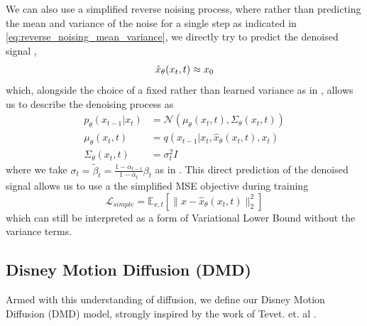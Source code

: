 We can also use a simplified reverse noising process, where rather than predicting the mean and variance of the noise for a single step as indicated in \eqref{eq:reverse_noising_mean_variance}, we directly try to predict the denoised signal \cite{ramesh2022hierarchical},
\begin{equation}
    \hat{x}_{\theta}(x_t, t) \approx x_0 \\
\end{equation}
which, alongside the choice of a fixed rather than learned variance as in \cite{ddpm}, allows us to describe the denoising process as
\begin{equation}
    \begin{aligned}
    p_{\theta}(x_{t-1} | x_t) &= \mathcal{N}(\mu_{\theta}(x_t, t), \Sigma_{\theta}(x_t, t)) \\
    \mu_{\theta}(x_t, t) &= q(x_{t-1} | x_t, \hat{x}_{\theta}(x_t, t), x_t) \\
    \Sigma_{\theta}(x_t, t) &= \sigma_t^2 I    
    \end{aligned}
\end{equation}
where we take $\sigma_t = \tilde{\beta}_t = \frac{1 - \bar{\alpha}_{t-1}}{1 - \bar{\alpha}_t} \beta_t$ as in \cite{ddpm}.
This direct prediction of the denoised signal allows us to use a the simplified MSE objective \cite{ddpm,ramesh2022hierarchical} during training
\begin{equation}
    \mathcal{L}_{simple} = \mathbb{E}_{x,t}\left[ \| x - \hat{x}_{\theta}(x_t, t) \|_2^2 \right]
\end{equation}
which can still be interpreted as a form of Variational Lower Bound without the variance terms.


\subsection{Disney Motion Diffusion (DMD)}
\label{sec:disney_motion_diffusion}
Armed with this understanding of diffusion, we define our Disney Motion Diffusion (DMD) model, strongly inspired by the work of Tevet. et. al \cite{MDM}.



